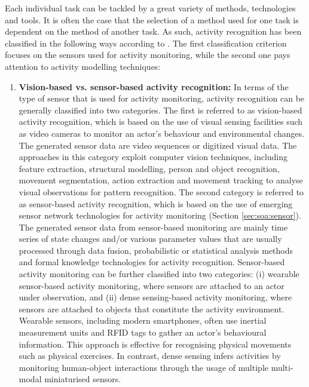Each individual task can be tackled by a great variety of methods, technologies and tools. It is often the case that the selection of a method used for one task is dependent on the method of another task. As such, activity recognition has been classified in the following ways according to \cite{Chen2012}. The first classification criterion focuses on the sensors used for activity monitoring, while the second one pays attention to activity modelling techniques:

\begin{enumerate}
 \item \textbf{Vision-based vs. sensor-based activity recognition:} In terms of the type of sensor that is used for activity monitoring, activity recognition can be generally classified into two categories. The first is referred to as vision-based activity recognition, which is based on the use of visual sensing facilities such as video cameras to monitor an actor’s behaviour and environmental changes. The generated sensor data are video sequences or digitized visual data. The approaches in this category exploit computer vision techniques, including feature extraction, structural modelling, person and object recognition, movement segmentation, action extraction and movement tracking to analyse visual observations for pattern recognition. The second category is referred to as sensor-based activity recognition, which is based on the use of emerging sensor network technologies for activity monitoring (Section \ref{sec:soa:sensor}). The generated sensor data from sensor-based monitoring are mainly time series of state changes and/or various parameter values that are usually processed through data fusion, probabilistic or statistical analysis methods and formal knowledge technologies for activity recognition. Sensor-based activity monitoring can be further classified into two categories: (i) wearable sensor-based activity monitoring, where sensors are attached to an actor under observation, and (ii) dense sensing-based activity monitoring, where sensors are attached to objects that constitute the activity environment. Wearable sensors, including modern smartphones, often use inertial measurement units and RFID tags to gather an actor’s behavioural information. This approach is effective for recognising physical movements such as physical exercises. In contrast, dense sensing infers activities by monitoring human-object interactions through the usage of multiple multi-modal miniaturised sensors.


\end{enumerate}
